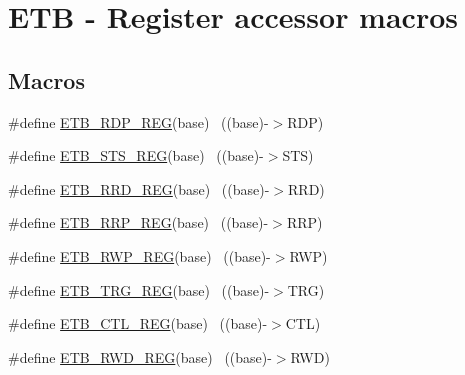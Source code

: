 \hypertarget{group___e_t_b___register___accessor___macros}{}\section{E\+TB -\/ Register accessor macros}
\label{group___e_t_b___register___accessor___macros}
\subsection*{Macros}
\begin{DoxyCompactItemize}
\item 
\#define \hyperlink{group___e_t_b___register___accessor___macros_ga36817424cf06e4403d00506c273da5c5}{E\+T\+B\+\_\+\+R\+D\+P\+\_\+\+R\+EG}(base)                                            ~((base)-\/$>$R\+DP)
\item 
\#define \hyperlink{group___e_t_b___register___accessor___macros_ga36fdad4715d60bf038d1a4ccaab29977}{E\+T\+B\+\_\+\+S\+T\+S\+\_\+\+R\+EG}(base)                                            ~((base)-\/$>$S\+TS)
\item 
\#define \hyperlink{group___e_t_b___register___accessor___macros_gad98611ab8b9a51e840c08af04d652539}{E\+T\+B\+\_\+\+R\+R\+D\+\_\+\+R\+EG}(base)                                            ~((base)-\/$>$R\+RD)
\item 
\#define \hyperlink{group___e_t_b___register___accessor___macros_ga72cdf2426cfe669c82dee1963a612045}{E\+T\+B\+\_\+\+R\+R\+P\+\_\+\+R\+EG}(base)                                            ~((base)-\/$>$R\+RP)
\item 
\#define \hyperlink{group___e_t_b___register___accessor___macros_gae99824f4296f3c7e023f412fe54b6148}{E\+T\+B\+\_\+\+R\+W\+P\+\_\+\+R\+EG}(base)                                            ~((base)-\/$>$R\+WP)
\item 
\#define \hyperlink{group___e_t_b___register___accessor___macros_ga01a52ef18993680d388fbd12372e86ca}{E\+T\+B\+\_\+\+T\+R\+G\+\_\+\+R\+EG}(base)                                            ~((base)-\/$>$T\+RG)
\item 
\#define \hyperlink{group___e_t_b___register___accessor___macros_ga7a6e91a5568bfb417a9c335a6e43714f}{E\+T\+B\+\_\+\+C\+T\+L\+\_\+\+R\+EG}(base)                                            ~((base)-\/$>$C\+TL)
\item 
\#define \hyperlink{group___e_t_b___register___accessor___macros_ga0623a583f4196324a3f5ee3cac75f6a2}{E\+T\+B\+\_\+\+R\+W\+D\+\_\+\+R\+EG}(base)                                            ~((base)-\/$>$R\+WD)

\end{DoxyCompactItemize}
